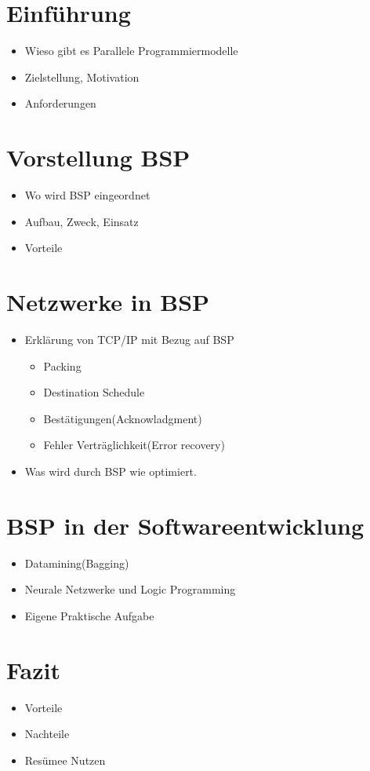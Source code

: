 \documentclass[a4paper,11pt]{report}
\begin{document}
\tableofcontents

\chapter{Einf\"uhrung}
\begin{itemize}
\item Wieso gibt es Parallele Programmiermodelle
\item Zielstellung, Motivation
\item Anforderungen
\end{itemize}
\chapter{Vorstellung BSP}
\begin{itemize}
\item Wo wird BSP eingeordnet
\item Aufbau, Zweck, Einsatz
\item Vorteile
\end{itemize}
\chapter{Netzwerke in BSP}
\begin{itemize}
\item Erklärung von TCP/IP mit Bezug auf BSP
\begin{itemize}
\item Packing
\item Destination Schedule
\item Bestätigungen(Acknowladgment)
\item Fehler Verträglichkeit(Error recovery)
\end{itemize}
\item Was wird durch BSP wie optimiert.

\end{itemize}
\chapter{BSP in der Softwareentwicklung}
\begin{itemize}
\item Datamining(Bagging)
\item Neurale Netzwerke und Logic Programming
\item Eigene Praktische Aufgabe
\end{itemize}
\chapter{Fazit}
\begin{itemize}
 \item Vorteile
 \item Nachteile
 \item Resümee Nutzen
\end{itemize}
\end{document}
